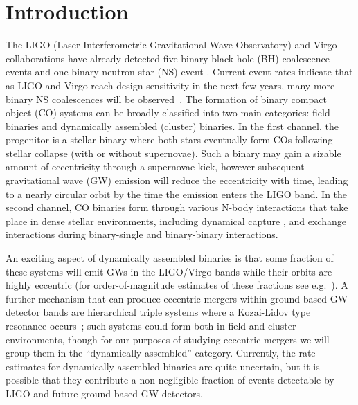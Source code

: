 \documentclass[prd,aps,floatfix,superscriptaddress,nofootinbib,twocolumn,10pt,English]{revtex4}
\begin{document}
\section{Introduction}

The LIGO (Laser Interferometric Gravitational Wave Observatory) and
Virgo collaborations have already detected five binary black hole (BH)
coalescence events
\cite{Abbott:2016blz,Abbott:2016nmj,PhysRevLett.118.221101,abbott2017gw170608,abbott2017gw170814}
and one binary neutron star (NS) event
\cite{abbott2017gw170817}. Current event rates indicate that as LIGO
and Virgo reach design sensitivity in the next few years, many more
binary NS coalescences will be observed~\cite{abbott2017gw170817}.
The formation of binary compact object (CO) systems can be broadly classified
into two main categories: field binaries and dynamically assembled (cluster)
binaries. In the first channel, the progenitor is a stellar
binary where both stars eventually form COs
following stellar collapse (with or without
supernovae). Such a binary may gain a sizable amount of eccentricity
through a supernovae kick, however subsequent gravitational wave (GW)
emission will reduce the eccentricity with time, leading to a nearly
circular orbit by the time the emission enters the LIGO band.
In the second channel, CO binaries form through
various N-body interactions that take place in dense stellar
environments, including dynamical capture 
\cite{o2009gravitational,lee2010,kocsis2012repeated,fabian1975tidal,pooley2003dynamical},
and exchange interactions during binary-single and binary-binary
interactions\cite{Samsing:2013kua,Rodriguez:2015oxa,samsing2017eccentric}.

An exciting aspect of dynamically assembled binaries is that some
fraction of these systems will emit GWs in the LIGO/Virgo bands while
their orbits are highly eccentric (for order-of-magnitude estimates of
these fractions see
e.g.~\cite{East:2012xq,Samsing:2013kua,samsing2017eccentric}).
A further mechanism that can produce eccentric mergers within ground-based GW detector bands
are hierarchical triple systems where a Kozai-Lidov type resonance
occurs~\cite{2003ApJ...598..419W,2013PhRvL.111f1106S,naoz2016eccentric,2017ApJ...841...77A,2018arXiv180508212R}; 
such systems could form both in field and cluster environments, though
for our purposes of studying eccentric mergers we will group them
in the ``dynamically assembled'' category.
Currently, the rate estimates for dynamically assembled binaries are
quite uncertain, but it is possible that they contribute a
non-negligible fraction of events detectable by LIGO and future
ground-based GW detectors.
\end{document}
